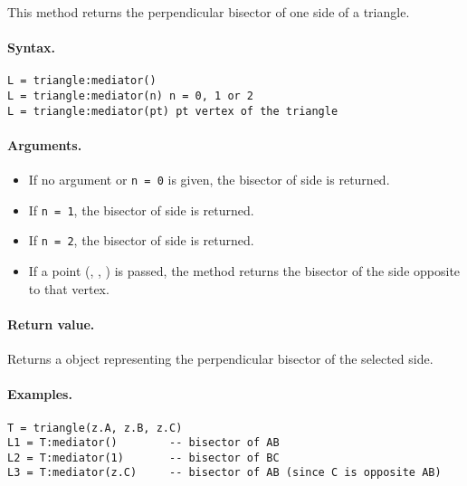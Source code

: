 This method returns the perpendicular bisector of one side of a triangle.

\paragraph{Syntax.}
\begin{verbatim}
L = triangle:mediator()
L = triangle:mediator(n) n = 0, 1 or 2
L = triangle:mediator(pt) pt vertex of the triangle
\end{verbatim}

\paragraph{Arguments.}

\begin{itemize}
  \item If no argument or \texttt{n = 0} is given, the bisector of side  is returned.
  \item If \texttt{n = 1}, the bisector of side  is returned.
  \item If \texttt{n = 2}, the bisector of side  is returned.
  \item If a point (, , ) is passed, the method returns the bisector of the side opposite to that vertex.
\end{itemize}

\paragraph{Return value.}

Returns a  object representing the perpendicular bisector of the selected side.

\paragraph{Examples.}

\begin{mybox}
\begin{verbatim}
T = triangle(z.A, z.B, z.C)
L1 = T:mediator()        -- bisector of AB
L2 = T:mediator(1)       -- bisector of BC
L3 = T:mediator(z.C)     -- bisector of AB (since C is opposite AB)
\end{verbatim}
\end{mybox}


\begin{tkzexample}[latex=.5\textwidth]

\begin{center}
\end{center}
\end{tkzexample}


